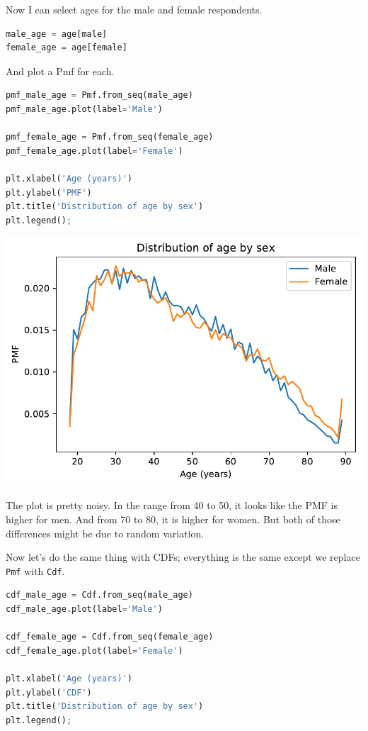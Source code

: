 Now I can select ages for the male and female respondents.

\begin{lstlisting}[language=Python]
male_age = age[male]
female_age = age[female]
\end{lstlisting}

And plot a Pmf for each.

\begin{lstlisting}[language=Python]
pmf_male_age = Pmf.from_seq(male_age)
pmf_male_age.plot(label='Male')

pmf_female_age = Pmf.from_seq(female_age)
pmf_female_age.plot(label='Female')

plt.xlabel('Age (years)') 
plt.ylabel('PMF')
plt.title('Distribution of age by sex')
plt.legend();
\end{lstlisting}

\begin{center}
\includegraphics[scale=0.75]{chapters/08_distributions_files/08_distributions_90_0.pdf}
\end{center}

The plot is pretty noisy. In the range from 40 to 50, it looks like the
PMF is higher for men. And from 70 to 80, it is higher for women. But
both of those differences might be due to random variation.

Now let's do the same thing with CDFs; everything is the same except we
replace \passthrough{\lstinline!Pmf!} with
\passthrough{\lstinline!Cdf!}.

\begin{lstlisting}[language=Python]
cdf_male_age = Cdf.from_seq(male_age)
cdf_male_age.plot(label='Male')

cdf_female_age = Cdf.from_seq(female_age)
cdf_female_age.plot(label='Female')

plt.xlabel('Age (years)') 
plt.ylabel('CDF')
plt.title('Distribution of age by sex')
plt.legend();
\end{lstlisting}

